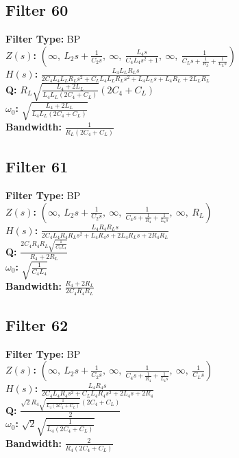 \documentclass{article}
\begin{document}
\subsection*{Filter 60}
\textbf{Filter Type:} BP \\ 
\textbf{$Z(s)$:} $\left( \infty, \  L_{2} s + \frac{1}{C_{2} s}, \  \infty, \  \frac{L_{4} s}{C_{4} L_{4} s^{2} + 1}, \  \infty, \  \frac{1}{C_{L} s + \frac{1}{R_{L}} + \frac{1}{L_{L} s}}\right)$ \\ 
\textbf{$H(s)$:} $\frac{L_{4} L_{L} R_{L} s}{2 C_{4} L_{4} L_{L} R_{L} s^{2} + C_{L} L_{4} L_{L} R_{L} s^{2} + L_{4} L_{L} s + L_{4} R_{L} + 2 L_{L} R_{L}}$ \\ 
\textbf{Q:} $R_{L} \sqrt{\frac{L_{4} + 2 L_{L}}{L_{4} L_{L} \left(2 C_{4} + C_{L}\right)}} \left(2 C_{4} + C_{L}\right)$ \\ 
\textbf{$\omega_0$:} $\sqrt{\frac{L_{4} + 2 L_{L}}{L_{4} L_{L} \left(2 C_{4} + C_{L}\right)}}$ \\ 
\textbf{Bandwidth:} $\frac{1}{R_{L} \left(2 C_{4} + C_{L}\right)}$ \\ 
\subsection*{Filter 61}
\textbf{Filter Type:} BP \\ 
\textbf{$Z(s)$:} $\left( \infty, \  L_{2} s + \frac{1}{C_{2} s}, \  \infty, \  \frac{1}{C_{4} s + \frac{1}{R_{4}} + \frac{1}{L_{4} s}}, \  \infty, \  R_{L}\right)$ \\ 
\textbf{$H(s)$:} $\frac{L_{4} R_{4} R_{L} s}{2 C_{4} L_{4} R_{4} R_{L} s^{2} + L_{4} R_{4} s + 2 L_{4} R_{L} s + 2 R_{4} R_{L}}$ \\ 
\textbf{Q:} $\frac{2 C_{4} R_{4} R_{L} \sqrt{\frac{1}{C_{4} L_{4}}}}{R_{4} + 2 R_{L}}$ \\ 
\textbf{$\omega_0$:} $\sqrt{\frac{1}{C_{4} L_{4}}}$ \\ 
\textbf{Bandwidth:} $\frac{R_{4} + 2 R_{L}}{2 C_{4} R_{4} R_{L}}$ \\ 
\subsection*{Filter 62}
\textbf{Filter Type:} BP \\ 
\textbf{$Z(s)$:} $\left( \infty, \  L_{2} s + \frac{1}{C_{2} s}, \  \infty, \  \frac{1}{C_{4} s + \frac{1}{R_{4}} + \frac{1}{L_{4} s}}, \  \infty, \  \frac{1}{C_{L} s}\right)$ \\ 
\textbf{$H(s)$:} $\frac{L_{4} R_{4} s}{2 C_{4} L_{4} R_{4} s^{2} + C_{L} L_{4} R_{4} s^{2} + 2 L_{4} s + 2 R_{4}}$ \\ 
\textbf{Q:} $\frac{\sqrt{2} R_{4} \sqrt{\frac{1}{L_{4} \left(2 C_{4} + C_{L}\right)}} \left(2 C_{4} + C_{L}\right)}{2}$ \\ 
\textbf{$\omega_0$:} $\sqrt{2} \sqrt{\frac{1}{L_{4} \left(2 C_{4} + C_{L}\right)}}$ \\ 
\textbf{Bandwidth:} $\frac{2}{R_{4} \left(2 C_{4} + C_{L}\right)}$ \\ 
\end{document}
